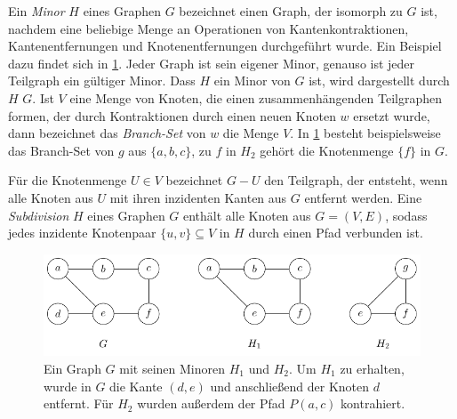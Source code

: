 Ein \emph{Minor} $H$ eines Graphen $G$ bezeichnet einen Graph, der isomorph zu $G$ ist, nachdem eine beliebige Menge an Operationen von Kantenkontraktionen, Kantenentfernungen und Knotenentfernungen durchgeführt wurde.
Ein Beispiel dazu findet sich in \Abb \ref{fig:Minor}.
Jeder Graph ist sein eigener Minor, genauso ist jeder Teilgraph ein gültiger Minor.
Dass $H$ ein Minor von $G$ ist, wird dargestellt durch $H$ \minor $G$. %
Ist $V$ eine Menge von Knoten, die einen zusammenhängenden Teilgraphen formen, der durch Kontraktionen durch einen neuen Knoten $w$ ersetzt wurde, dann bezeichnet das \emph{Branch-Set} von $w$ die Menge $V$.
In \Abb \ref{fig:Minor} besteht beispielsweise das Branch-Set von $g$ aus $\{a, b, c\}$, zu $f$ in $H_2$ gehört die Knotenmenge $\{f\}$ in $G$.

Für die Knotenmenge $U \in V$ bezeichnet $G - U$ den Teilgraph, der entsteht, wenn alle Knoten aus $U$ mit ihren inzidenten Kanten aus $G$ entfernt werden.
Eine \emph{Subdivision} $H$ eines Graphen $G$ enthält alle Knoten aus $G = (V, E)$, sodass jedes inzidente Knotenpaar $\{u, v\} \subseteq V$ in $H$ durch einen Pfad verbunden ist.
\begin{figure}[H]
  \centering
  \includegraphics[keepaspectratio]{bilder/Minor.pdf}
  \caption{Ein Graph $G$ mit seinen Minoren $H_1$ und $H_2$.
           Um $H_1$ zu erhalten, wurde in $G$ die Kante $(d, e)$ und anschließend der Knoten $d$ entfernt.
           Für $H_2$ wurden außerdem der Pfad $P(a, c)$ kontrahiert.}
  \label{fig:Minor}
\end{figure}

